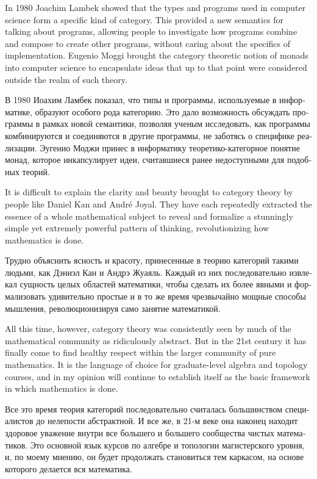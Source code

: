 \documentclass[a4paper]{book}
\theoremstyle{myth}
\begin{document}
\begin{russian}
In 1980 Joachim Lambek showed that the types and programs used in computer science form a specific kind of category. This provided a new semantics for talking about programs, allowing people to investigate how programs combine and compose to create other programs, without caring about the specifics of implementation. Eugenio Moggi brought the category theoretic notion of monads into computer science to encapsulate ideas that up to that point were considered outside the realm of such theory.

В 1980 Иоахим Ламбек показал, что типы и программы, используемые в информатике, образуют особого рода категорию. Это дало возможность обсуждать программы в рамках новой семантики, позволяя ученым исследовать, как программы комбинируются и соединяются в другие программы, не заботясь о специфике реализации. Эугенио Моджи принес в информатику теоретико-категорное понятие монад, которое инкапсулирует идеи, считавшиеся ранее недоступными для подобных теорий. 

It is difficult to explain the clarity and beauty brought to category theory by people like Daniel Kan and Andr\'{e} Joyal. They have each repeatedly extracted the essence of a whole mathematical subject to reveal and formalize a stunningly simple yet extremely powerful pattern of thinking, revolutionizing how mathematics is done.

Трудно объяснить ясность и красоту, принесенные в теорию категорий такими людьми, как Дэниэл Кан и Андрэ Жуаяль. Каждый из них последовательно извлекал сущность целых областей математики, чтобы сделать их более явными и формализовать удивительно простые и в то же время чрезвычайно мощные способы мышления, революционизируя само занятие математикой. 

All this time, however, category theory was consistently seen by much of the mathematical community as ridiculously abstract. But in the 21st century it has finally come to find healthy respect within the larger community of pure mathematics. It is the language of choice for graduate-level algebra and topology courses, and in my opinion will continue to establish itself as the basic framework in which mathematics is done.

Все это время теория категорий последовательно считалась большинством специалистов до нелепости абстрактной. И все же, в 21-м веке она наконец находит здоровое уважение внутри все большего и большего сообщества чистых математиков. Это основной язык курсов по алгебре и топологии магистерского уровня, и, по моему мнению, он будет продолжать становиться тем каркасом, на основе которого делается вся математика. 


\end{russian}
\end{document}
